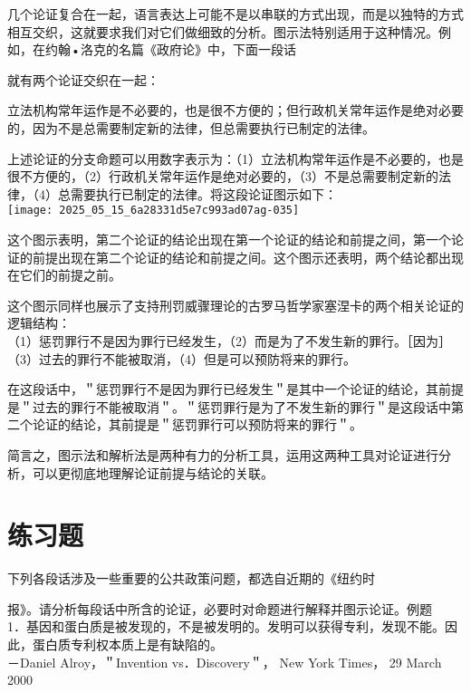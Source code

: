 几个论证复合在一起，语言表达上可能不是以串联的方式出现，而是以独特的方式相互交织，这就要求我们对它们做细致的分析。图示法特别适用于这种情况。例如，在约翰•洛克的名篇《政府论》中，下面一段话

就有两个论证交织在一起：

立法机构常年运作是不必要的，也是很不方便的；但行政机关常年运作是绝对必要的，因为不是总需要制定新的法律，但总需要执行已制定的法律。

上述论证的分支命题可以用数字表示为：（1）立法机构常年运作是不必要的，也是很不方便的，（2）行政机关常年运作是绝对必要的，（3）不是总需要制定新的法律，（4）总需要执行已制定的法律。将这段论证图示如下：\\
\texttt{[image: 2025\_05\_15\_6a28331d5e7c993ad07ag-035]}

这个图示表明，第二个论证的结论出现在第一个论证的结论和前提之间，第一个论证的前提出现在第二个论证的结论和前提之间。这个图示还表明，两个结论都出现在它们的前提之前。

这个图示同样也展示了支持刑罚威骤理论的古罗马哲学家塞涅卡的两个相关论证的逻辑结构：\\
（1）惩罚罪行不是因为罪行已经发生，（2）而是为了不发生新的罪行。［因为］（3）过去的罪行不能被取消，（4）但是可以预防将来的罪行。

在这段话中，＂惩罚罪行不是因为罪行已经发生＂是其中一个论证的结论，其前提是＂过去的罪行不能被取消＂。＂惩罚罪行是为了不发生新的罪行＂是这段话中第二个论证的结论，其前提是＂惩罚罪行可以预防将来的罪行＂。

简言之，图示法和解析法是两种有力的分析工具，运用这两种工具对论证进行分析，可以更彻底地理解论证前提与结论的关联。

\section*{练习题}
下列各段话涉及一些重要的公共政策问题，都选自近期的《纽约时

报》。请分析每段话中所含的论证，必要时对命题进行解释并图示论证。例题\\
1．基因和蛋白质是被发现的，不是被发明的。发明可以获得专利，发现不能。因此，蛋白质专利权本质上是有缺陷的。\\
－Daniel Alroy，＂Invention vs．Discovery＂， New York Times， 29 March 2000

